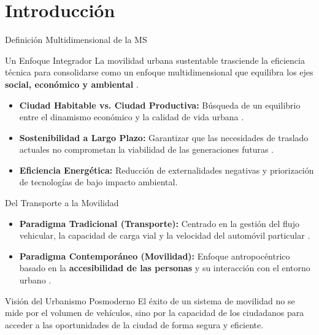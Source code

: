
\section{Introducción}

\begin{frame}{Definición Multidimensional de la MS}
    \begin{block}{Un Enfoque Integrador}
        La movilidad urbana sustentable trasciende la eficiencia técnica para consolidarse como un enfoque multidimensional que equilibra 
        los ejes \textbf{social, económico y ambiental} \cite{RamirezPacheco2025}.
    \end{block}
    \begin{itemize}
        \item \textbf{Ciudad Habitable vs. Ciudad Productiva:} Búsqueda de un equilibrio entre el dinamismo económico y la calidad de 
                vida urbana \cite{RedalycPeaton}.
        \item \textbf{Sostenibilidad a Largo Plazo:} Garantizar que las necesidades de traslado actuales no comprometan la viabilidad de 
                las generaciones futuras \cite{SEDATU2023}.
        \item \textbf{Eficiencia Energética:} Reducción de externalidades negativas y priorización de tecnologías de bajo impacto ambiental.
    \end{itemize}
\end{frame}


\begin{frame}{Del Transporte a la Movilidad}
    \begin{itemize}
        \item \textbf{Paradigma Tradicional (Transporte):} Centrado en la gestión del flujo vehicular, la capacidad de carga vial y la velocidad del automóvil particular \cite{RedalycPeaton}.
        \item \textbf{Paradigma Contemporáneo (Movilidad):} Enfoque antropocéntrico basado en la \textbf{accesibilidad de las personas} y su interacción con el entorno urbano \cite{ramirez2025analisis}.
    \end{itemize}

    \begin{exampleblock}{Visión del Urbanismo Posmoderno}
        El éxito de un sistema de movilidad no se mide por el volumen de vehículos, sino por la capacidad de los ciudadanos para acceder a las oportunidades de la ciudad de forma segura y eficiente.
    \end{exampleblock}
\end{frame}

